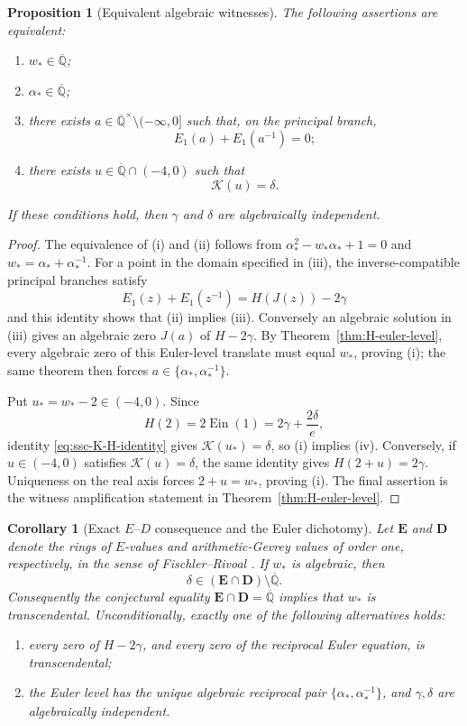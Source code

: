 \documentclass[11pt]{article}
\newtheorem{proposition}[theorem]{Proposition}
\newtheorem{corollary}[theorem]{Corollary}
\theoremstyle{definition}
\theoremstyle{remark}
\newcommand{\Qbar}{\overline{\mathbb Q}}
\newcommand{\Ein}{\operatorname{Ein}}
\begin{document}
\begin{proposition}[Equivalent algebraic witnesses]
\label{prop:ssc-euler-equivalences}
The following assertions are equivalent:
\begin{enumerate}[label=\textup{(\roman*)}]
 \item \(w_*\in\Qbar\);
 \item \(\alpha_*\in\Qbar\);
 \item there exists
       \(a\in\Qbar^\times\setminus(-\infty,0]\) such that, on the
       principal branch,
       \[
        E_1(a)+E_1(a^{-1})=0;
       \]
 \item there exists \(u\in\Qbar\cap(-4,0)\) such that
       \[
        \mathcal K(u)=\delta.
       \]
\end{enumerate}
If these conditions hold, then \(\gamma\) and \(\delta\) are
algebraically independent.
\end{proposition}

\begin{proof}
The equivalence of (i) and (ii) follows from
\(\alpha_*^2-w_*\alpha_*+1=0\) and
\(w_*=\alpha_*+\alpha_*^{-1}\).  For a point in the domain specified in
(iii), the inverse-compatible principal branches satisfy
\[
 E_1(z)+E_1(z^{-1})=H(J(z))-2\gamma
\]
and this identity shows that (ii) implies (iii).  Conversely an algebraic
solution in (iii)
gives an algebraic zero \(J(a)\) of \(H-2\gamma\).  By
Theorem~\ref{thm:H-euler-level}, every algebraic zero of this Euler-level
translate must equal \(w_*\), proving (i); the same theorem then forces
\(a\in\{\alpha_*,\alpha_*^{-1}\}\).

Put \(u_*=w_*-2\in(-4,0)\).  Since
\[
 H(2)=2\Ein(1)=2\gamma+\frac{2\delta}{e},
\]
identity \eqref{eq:ssc-K-H-identity} gives
\(\mathcal K(u_*)=\delta\), so (i) implies (iv).  Conversely, if
\(u\in(-4,0)\) satisfies \(\mathcal K(u)=\delta\), the same identity
gives \(H(2+u)=2\gamma\).  Uniqueness on the real axis forces
\(2+u=w_*\), proving (i).  The final assertion is the witness
amplification statement in Theorem~\ref{thm:H-euler-level}.
\end{proof}

\begin{corollary}[Exact \(E\)--\(D\) consequence and the Euler dichotomy]
\label{cor:ssc-ED-dichotomy}
Let \(\mathbf E\) and \(\mathbf D\) denote the rings of \(E\)-values and
arithmetic-Gevrey values of order one, respectively, in the sense of
Fischler--Rivoal \cite{FR2024ED}.  If \(w_*\) is algebraic, then
\[
 \delta\in(\mathbf E\cap\mathbf D)\setminus\Qbar.
\]
Consequently the conjectural equality
\(\mathbf E\cap\mathbf D=\Qbar\) implies that \(w_*\) is
transcendental.  Unconditionally, exactly one of the following alternatives
holds:
\begin{enumerate}[label=\textup{(\alph*)}]
 \item every zero of \(H-2\gamma\), and every zero of the reciprocal
       Euler equation, is transcendental;
 \item the Euler level has the unique algebraic reciprocal pair
       \(\{\alpha_*,\alpha_*^{-1}\}\), and \(\gamma,\delta\) are
       algebraically independent.
\end{enumerate}
\end{corollary}
\end{document}
